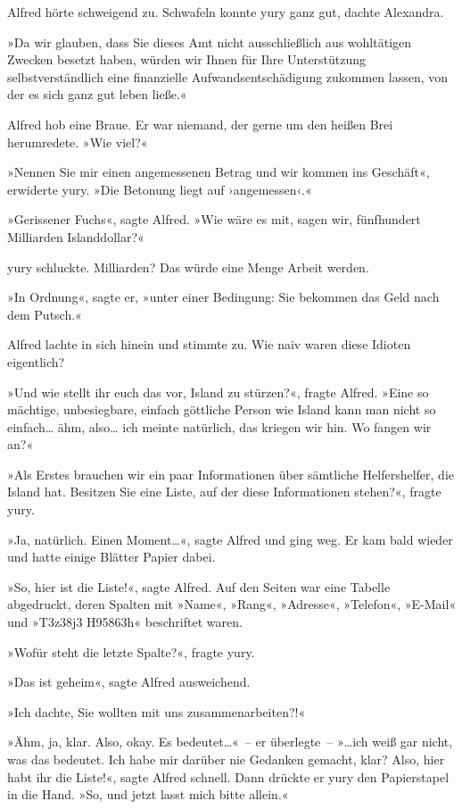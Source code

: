 Alfred hörte schweigend zu. Schwafeln konnte yury ganz gut, dachte Alexandra.

»Da wir glauben, dass Sie dieses Amt nicht ausschließlich aus wohltätigen Zwecken besetzt haben, würden wir Ihnen für Ihre Unterstützung selbstverständlich eine finanzielle Aufwandsentschädigung zukommen lassen, von der es sich ganz gut leben ließe.«

Alfred hob eine Braue. Er war niemand, der gerne um den heißen Brei herumredete. »Wie viel?«

»Nennen Sie mir einen angemessenen Betrag und wir kommen ins Geschäft«, erwiderte yury. »Die Betonung liegt auf ›angemessen‹.«

»Gerissener Fuchs«, sagte Alfred. »Wie wäre es mit, sagen wir, fünfhundert Milliarden Islanddollar?«

yury schluckte. Milliarden? Das würde eine Menge Arbeit werden.

»In Ordnung«, sagte er, »unter einer Bedingung: Sie bekommen das Geld nach dem Putsch.«

Alfred lachte in sich hinein und stimmte zu. Wie naiv waren diese Idioten eigentlich?

»Und wie stellt ihr euch das vor, Island zu stürzen?«, fragte Alfred. »Eine so mächtige, unbesiegbare, einfach göttliche Person wie Island kann man nicht so einfach… ähm, also… ich meinte natürlich, das kriegen wir hin. Wo fangen wir an?«

»Als Erstes brauchen wir ein paar Informationen über sämtliche Helfershelfer, die Island hat. Besitzen Sie eine Liste, auf der diese Informationen stehen?«, fragte yury.

»Ja, natürlich. Einen Moment…«, sagte Alfred und ging weg. Er kam bald wieder und hatte einige Blätter Papier dabei.

»So, hier ist die Liste!«, sagte Alfred. Auf den Seiten war eine Tabelle abgedruckt, deren Spalten mit »Name«, »Rang«, »Adresse«, »Telefon«, »E-Mail« und »T3z38j3 H95863h« beschriftet waren.

»Wofür steht die letzte Spalte?«, fragte yury.

»Das ist geheim«, sagte Alfred ausweichend.

»Ich dachte, Sie wollten mit uns zusammenarbeiten?!«

»Ähm, ja, klar. Also, okay. Es bedeutet…«~– er überlegte~– »…ich weiß gar nicht, was das bedeutet. Ich habe mir darüber nie Gedanken gemacht, klar? Also, hier habt ihr die Liste!«, sagte Alfred schnell. Dann drückte er yury den Papierstapel in die Hand. »So, und jetzt lasst mich bitte allein.«


